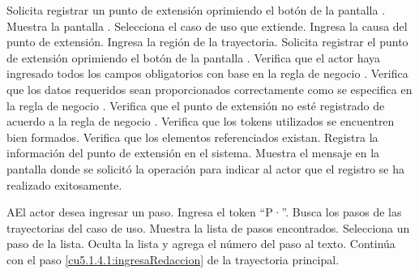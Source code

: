 
 \begin{UCtrayectoria}
	\UCpaso[\UCactor] Solicita registrar un punto de extensión oprimiendo el botón  de la pantalla . 
	\UCpaso[\UCsist] Muestra la pantalla . 
	\UCpaso[\UCactor] Selecciona el caso de uso que extiende. \label{cu5.1.4.1:ingresaDatos}
	\UCpaso[\UCactor] Ingresa la causa del punto de extensión.
	\UCpaso[\UCactor] Ingresa la región de la trayectoria. \label{cu5.1.4.1:ingresaRedaccion} 
	\UCpaso[\UCactor] Solicita registrar el punto de extensión oprimiendo el botón  de la pantalla .  
	\UCpaso[\UCsist] Verifica que el actor haya ingresado todos los campos obligatorios con base en la regla de negocio . 
	\UCpaso[\UCsist] Verifica que los datos requeridos sean proporcionados correctamente como se especifica en la regla de negocio .  
	\UCpaso[\UCsist] Verifica que el punto de extensión no esté registrado de acuerdo a la regla de negocio . 
	\UCpaso[\UCsist] Verifica que los tokens utilizados se encuentren bien formados. 
	\UCpaso[\UCsist] Verifica que los elementos referenciados existan. 
	\UCpaso[\UCsist] Registra la información del punto de extensión en el sistema.
	\UCpaso[\UCsist] Muestra el mensaje  en la pantalla donde se solicitó la operación
	para indicar al actor que el registro se ha realizado exitosamente. 
\end{UCtrayectoria}

 \begin{UCtrayectoriaA}{A}{El actor desea ingresar un paso.}
 	\UCpaso[\UCactor] Ingresa el token ``P·''.
  	\UCpaso[\UCsist] Busca los pasos de las trayectorias del caso de uso.
  	\UCpaso[\UCsist] Muestra la lista de pasos encontrados.
 	\UCpaso[\UCactor] Selecciona un paso de la lista.
  	\UCpaso[\UCsist] Oculta la lista y agrega el número del paso al texto.
    \UCpaso[] Continúa con el paso \ref{cu5.1.4.1:ingresaRedaccion} de la trayectoria principal.
 \end{UCtrayectoriaA}

